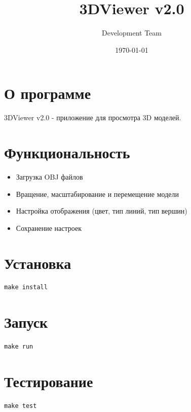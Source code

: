 \documentclass{article}
\title{3DViewer v2.0}
\author{Development Team}
\date{\today}
\begin{document}
\maketitle

\section{О программе}
3DViewer v2.0 - приложение для просмотра 3D моделей.

\section{Функциональность}
\begin{itemize}
  \item Загрузка OBJ файлов
  \item Вращение, масштабирование и перемещение модели
  \item Настройка отображения (цвет, тип линий, тип вершин)
  \item Сохранение настроек
\end{itemize}

\section{Установка}
\begin{verbatim}
make install
\end{verbatim}

\section{Запуск}
\begin{verbatim}
make run
\end{verbatim}

\section{Тестирование}
\begin{verbatim}
make test
\end{verbatim}
\end{document}
